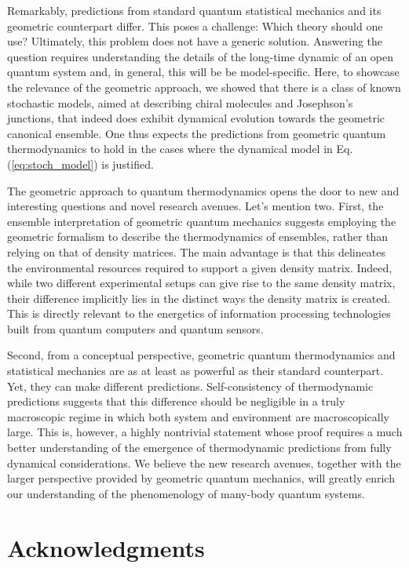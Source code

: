 \documentclass[draft,nofootinbib,pre,twocolumn,showpacs,showkeys,groupaddress,preprintnumbers,floatfix]{revtex4-1}
\newcommand{\1}{\mathbbm{1}}
\begin{document}
Remarkably, predictions from standard quantum statistical mechanics and its
geometric counterpart differ. This poses a challenge: Which theory should one
use? Ultimately, this problem does not have a generic solution. Answering the
question requires understanding the details of the long-time dynamic of an
open quantum system and, in general, this will be be model-specific. Here, to
showcase the relevance of the geometric approach, we showed that there is a
class of known stochastic models, aimed at describing chiral molecules and
Josephson's junctions, that indeed does exhibit dynamical evolution towards
the geometric canonical ensemble. One thus expects the predictions from
geometric quantum thermodynamics to hold in the cases where the dynamical
model in Eq. (\ref{eq:stoch_model}) is justified.

The geometric approach to quantum thermodynamics opens the door to new and
interesting questions and novel research avenues. Let's mention two. First, the
ensemble interpretation of geometric quantum mechanics suggests employing the
geometric formalism to describe the thermodynamics of ensembles, rather than
relying on that of density matrices. The main advantage is that this
delineates the environmental resources required to support a given density
matrix. Indeed, while two different experimental setups can give rise to the
same density matrix, their difference implicitly lies in the distinct ways the
density matrix is created. This is directly relevant to the energetics of
information processing technologies built from quantum computers and quantum
sensors.

Second, from a conceptual perspective, geometric quantum thermodynamics and
statistical mechanics are as at least as powerful as their standard
counterpart. Yet, they can make different predictions. Self-consistency of
thermodynamic predictions suggests that this difference should be negligible
in a truly macroscopic regime in which both system and environment are
macroscopically large. This is, however, a highly nontrivial statement whose
proof requires a much better understanding of the emergence of thermodynamic
predictions from fully dynamical considerations. We believe the new research
avenues, together with the larger perspective provided by geometric quantum
mechanics, will greatly enrich our understanding of the phenomenology of
many-body quantum systems.

\section*{Acknowledgments}
\label{sec:acknowledgments}
\end{document}
